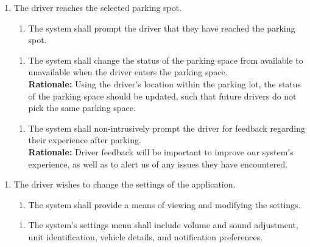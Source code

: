 \documentclass[12pt,letterpaper]{article}
\newcounter{businesseventnum}
\newcounter{funcreqnum}
\begin{document}
\begin{enumerate}[{BE}\thebusinesseventnum.] 
\item The driver reaches the selected parking spot.
\begin{enumerate}[{FR}\thefuncreqnum.] 
    \item The system shall prompt the driver that they have reached the parking
    spot. \label{poc4}
\end{enumerate}

\begin{enumerate}[{FR}\thefuncreqnum.] 
    \item The system shall change the status of the parking space from available
    to unavailable when the driver enters the parking space. \label{poc5}\\
    \textbf{Rationale:} Using the driver's location within the parking lot, the
    status of the parking space should be updated, such that future drivers do
    not pick the same parking space.
\end{enumerate}
\begin{enumerate}[{FR}\thefuncreqnum.] 
    \item The system shall non-intrusively prompt the driver for feedback
    regarding their experience after parking.\\
    \textbf{Rationale:} Driver feedback will be important to improve our
    system's experience, as well as to alert us of any issues they have
    encountered.
\end{enumerate}
\end{enumerate}

\begin{enumerate}[{BE}\thebusinesseventnum.] 
\item The driver wishes to change the settings of the application.
\begin{enumerate}[{FR}\thefuncreqnum.] 
    \item The system shall provide a means of viewing and modifying the
    settings.
\end{enumerate}

\begin{enumerate}[{FR}\thefuncreqnum.] 
    \item The system's settings menu shall include volume and sound adjustment,
    unit identification, vehicle details, and notification preferences.
\end{enumerate}
\end{enumerate}
\end{document}
